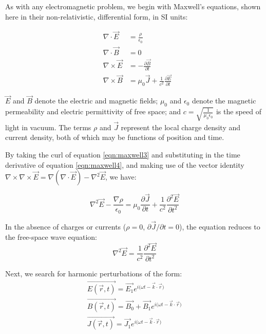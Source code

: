 As with any electromagnetic problem, we begin with Maxwell's equations, shown here in their non-relativistic, differential form, in SI units:

\begin{eqnarray}
&\nabla \cdot \vec{E}& = \frac{\rho}{\epsilon_0} \label{eqn:maxwell1}\\
&\nabla \cdot \vec{B}& = 0 \label{eqn:maxwell2}\\
&\nabla \times \vec{E}& = -\frac{\partial \vec{B}}{\partial t} \label{eqn:maxwell3}\\
&\nabla \times \vec{B}& = \mu_0 \vec{J} + \frac{1}{c^2}\frac{\partial \vec{E}}{\partial t} \label{eqn:maxwell4}
\end{eqnarray}

$\vec{E}$ and $\vec{B}$ denote the electric and magnetic fields; $\mu_0$ and $\epsilon_0$ denote the magnetic permeability and electric permittivity of free space; and $c=\sqrt{\frac{1}{\mu_0\epsilon_0}}$ is the speed of light in vacuum. The terms $\rho$ and $\vec{J}$ represent the local charge density and current density, both of which may be functions of position and time.

By taking the curl of equation \ref{eqn:maxwell3} and substituting in the time derivative of equation \ref{eqn:maxwell4}, and making use of the vector identity $\nabla \times \nabla \times \vec{E} = \nabla(\nabla \cdot \vec{E}) - \nabla^2\vec{E}$, we have:

\begin{equation}
\nabla^2\vec{E} - \frac{\nabla\rho}{\epsilon_0} = \mu_0 \frac{\partial \vec{J}}{\partial t} + \frac{1}{c^2}\frac{\partial^2\vec{E}}{\partial t^2}
\label{eqn:dielectric_tensor_derivation_1}
\end{equation}

In the absence of charges or currents ($\rho=0$, $\partial\vec{J}/\partial t=0$), the equation reduces to the free-space wave equation:
\begin{equation}
\nabla^2\vec{E} = \frac{1}{c^2}\frac{\partial^2\vec{E}}{\partial t^2}
\end{equation}

Next, we search for harmonic perturbations of the form:
\begin{eqnarray}
\vec{E(\vec{r},t)} = \vec{E_1}e^{{i (\omega t - \vec{k}\cdot \vec{r}})} \label{eqn:linear1}\\ 
\vec{B(\vec{r},t)} = \vec{B_0} + \vec{B_1}e^{{i (\omega t - \vec{k}\cdot \vec{r}})} \label{eqn:linear2}\\
\vec{J(\vec{r},t)} = \vec{J_1}e^{{i (\omega t - \vec{k}\cdot \vec{r}})}\label{eqn:linear3} 
\end{eqnarray}

